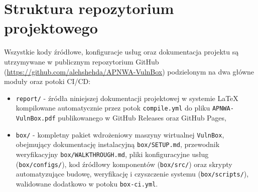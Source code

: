 \section{Struktura repozytorium projektowego}
\label{sec:struktura-repo}

Wszystkie kody źródłowe, konfiguracje usług oraz dokumentacja projektu są utrzymywane w publicznym repozytorium GitHub (\url{https://github.com/alehshehda/APNWA-VulnBox}) \cite{vulnbox_repo} podzielonym na dwa główne moduły oraz potoki CI/CD:
\begin{itemize}
    \item \texttt{report/} - źródła niniejszej dokumentacji projektowej w systemie \LaTeX{} kompilowane automatycznie przez potok \texttt{compile.yml} do pliku \texttt{APNWA-VulnBox.pdf} publikowanego w GitHub Releases oraz GitHub Pages,
    \item \texttt{box/} - kompletny pakiet wdrożeniowy maszyny wirtualnej \texttt{VulnBox}, obejmujący dokumentację instalacyjną \texttt{box/SETUP.md}, przewodnik weryfikacyjny \texttt{box/WALKTHROUGH.md}, pliki konfiguracyjne usług (\texttt{box/configs/}), kod źródłowy komponentów (\texttt{box/src/}) oraz skrypty automatyzujące budowę, weryfikację i czyszczenie systemu (\texttt{box/scripts/}), walidowane dodatkowo w potoku \texttt{box-ci.yml}.
\end{itemize}
